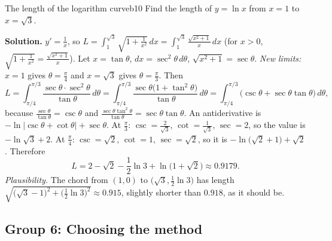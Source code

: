 \documentclass[11pt]{article}
\begin{document}
\begin{exmp}{The length of the logarithm curve}{b10}
Find the length of $y=\ln x$ from $x=1$ to $x=\sqrt3$.

\textbf{Solution.} $y'=\frac1x$, so $L=\int_1^{\sqrt3}\sqrt{1+\frac1{x^2}}\,dx=\int_1^{\sqrt3}\frac{\sqrt{x^2+1}}x\,dx$ (for $x>0$, $\sqrt{1+\frac1{x^2}}=\frac{\sqrt{x^2+1}}{x}$). Let $x=\tan\theta$, $dx=\sec^2\theta\,d\theta$, $\sqrt{x^2+1}=\sec\theta$. \emph{New limits:} $x=1$ gives $\theta=\frac\pi4$ and $x=\sqrt3$ gives $\theta=\frac\pi3$. Then
\[L=\int_{\pi/4}^{\pi/3}\frac{\sec\theta\cdot\sec^2\theta}{\tan\theta}\,d\theta=\int_{\pi/4}^{\pi/3}\frac{\sec\theta\big(1+\tan^2\theta\big)}{\tan\theta}\,d\theta=\int_{\pi/4}^{\pi/3}\big(\csc\theta+\sec\theta\tan\theta\big)\,d\theta,\]
because $\frac{\sec\theta}{\tan\theta}=\csc\theta$ and $\frac{\sec\theta\tan^2\theta}{\tan\theta}=\sec\theta\tan\theta$. An antiderivative is $-\ln\lvert\csc\theta+\cot\theta\rvert+\sec\theta$. At $\frac\pi3$: $\csc=\frac2{\sqrt3}$, $\cot=\frac1{\sqrt3}$, $\sec=2$, so the value is $-\ln\sqrt3+2$. At $\frac\pi4$: $\csc=\sqrt2$, $\cot=1$, $\sec=\sqrt2$, so it is $-\ln\big(\sqrt2+1\big)+\sqrt2$. Therefore
\[L=2-\sqrt2-\frac12\ln3+\ln\big(1+\sqrt2\big)\approx0.9179 .\]
\emph{Plausibility.} The chord from $(1,0)$ to $\big(\sqrt3,\frac12\ln3\big)$ has length $\sqrt{\big(\sqrt3-1\big)^2+\big(\frac12\ln3\big)^2}\approx0.915$, slightly shorter than $0.918$, as it should be.
\end{exmp}

\subsection*{Group 6: Choosing the method}
\end{document}
